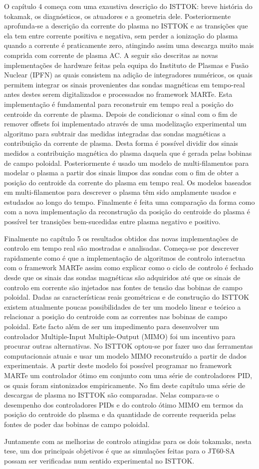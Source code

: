 O capítulo 4 começa com uma exaustiva descrição do ISTTOK: breve história do tokamak, os diagnósticos, os atuadores e a geometria dele. Posteriormente aprofunda-se a descrição da corrente do plasma no ISTTOK e as transições que ela tem entre corrente positiva e negativa, sem perder a ionização do plasma quando a corrente é praticamente zero, atingindo assim uma descarga muito mais comprida com corrente de plasma AC. A seguir  são descritas as novas implementações de hardware feitas pela equipa do Instituto de Plasmas e Fusão Nuclear (IPFN)  as quais consistem na adição de integradores numéricos, os quais permitem integrar os sinais provenientes das sondas magnéticas em tempo-real antes destes serem digitalizados e processados no framework MARTe. Esta implementação é fundamental para reconstruir em tempo real a posição do centroide da corrente de plasma.  Depois de condicionar o sinal com o fim de remover offsets foi implementado através de uma modelização experimental um algoritmo para subtrair das medidas integradas das sondas magnéticas a contribuição da corrente de plasma. Desta forma é possível dividir dos sinais medidos a contribuição magnética do plasma daquela que é gerada pelas bobinas de campo poloidal. Posteriormente é usado um modelo de multi-filamentos para modelar o plasma a partir dos sinais limpos das sondas com o fim de obter a posição do centroide da corrente do plasma em tempo real. Os modelos baseados em multi-filamentos para descrever o plasma têm sido amplamente usados e estudados ao longo do tempo.  Finalmente é feita  uma comparação da forma como com a nova implementação da reconstrução da posição do centroide do plasma é possível ter transições bem-sucedidas entre plasma negativo e positivo. \smallskip

Finalmente no capítulo 5 os resultados obtidos das novas implementações de controlo em tempo real são mostradas e analisadas. Começa-se por descrever rapidamente como é que a implementação de algoritmos de controlo interactua com o framework MARTe assim como explicar como o ciclo de controlo é fechado desde que os sinais das sondas magnéticas são adquiridos até que os sinais de controlo em corrente são injetados nas fontes de tensão das bobinas de campo poloidal. Dadas as características reais geométricas e de construção do ISTTOK existem atualmente poucas possibilidades de ter um modelo linear e teórico a relacionar a posição do centroide com as correntes nas bobinas de campo poloidal. Este facto além de ser um impedimento para desenvolver um controlador Multiple-Input Multiple-Output (MIMO) foi um incentivo para procurar outras alternativas. No ISTTOK optou-se por fazer uso das ferramentas computacionais atuais e usar um modelo MIMO reconstruído a partir de dados experimentais. A partir deste modelo foi possível programar no framework MARTe um controlador ótimo em conjunto com uma série de controladores PID, os quais foram sintonizados empiricamente. No fim deste capítulo  uma série de descargas de plasma no ISTTOK são comparadas. Nelas compara-se o desempenho dos controladores  PIDs e do controlo ótimo MIMO em termos da posição do centroide do plasma e da quantidade de corrente requerida pelas fontes de poder das bobinas de campo poloidal. \smallskip

Juntamente com as melhorias de controlo atingidas para os dois tokamaks, nesta tese, um dos principais objetivos é que as simulações feitas para o JT60-SA possam ser verificadas num sentido experimental no ISTTOK.


\vfill

